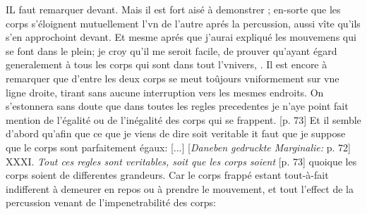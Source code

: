 \pend 
\count{}
\pstart  
[p. 70] IL faut remarquer  devant. Mais il est fort ais\'{e} \`{a} demonstrer ; en-sorte que les corps s'\'{e}loignent mutuellement l'vn de l'autre apr\'{e}s la percussion, aussi v\^{i}te qu'ils s'en approchoint devant.
\pend 
\pstart  
[p. 71] Et mesme apr\'{e}s que j'aurai expliqu\'{e} les mouvemens qui se font dans le plein; je croy qu'il me seroit facile, de prouver qu'ayant \'{e}gard generalement \`{a} tous les corps qui sont dans tout l'vnivers,  .
\pend 
\count{}
\pstart  
[p. 72] Il est encore \`{a} remarquer que  d'entre les deux corps se meut to\^{u}jours vniformement sur vne ligne droite, tirant sans aucune interruption vers les mesmes endroits.
\pend 
\count{}
\pstart  
[p. 72] On s'estonnera sans doute que dans toutes les regles precedentes je n'aye point fait mention de l'\'{e}galit\'{e} ou de l'in\'{e}galit\'{e} des corps qui se frappent. [p. 73] Et il semble d'abord qu'afin que ce que je viens de dire soit veritable it faut que je suppose que le corps sont parfaitement \'{e}gaux: [...] [\textit{Daneben gedruckte Marginalie:} p. 72] XXXI. \textit{Tout ces regles sont veritables, soit que les corps soient} [p. 73] 
\pend 
\count{}
\pstart  
[p. 74]  quoique les corps soient de differentes grandeurs. Car le corps frapp\'{e} estant tout-\`{a}-fait indifferent \`{a} demeurer en repos ou \`{a} prendre le mouvement, et tout l'effect de la percussion venant de l'impenetrabilit\'{e} des corps:
